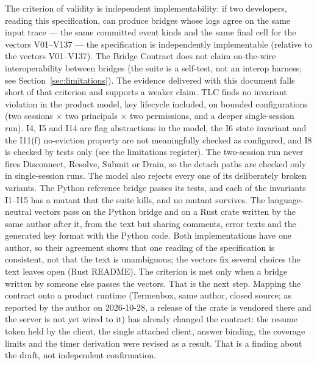 The criterion of validity is independent implementability: if two
developers, reading this specification, can produce bridges whose logs
agree on the same input trace --- the same committed event kinds and the
same final cell for the vectors V01--V137 --- the specification is
independently implementable (relative to the vectors V01--V137). The Bridge Contract does not claim on-the-wire
interoperability between bridges (the suite is a self-test, not an
interop harness; see Section~\ref{sec:limitations}). The evidence
delivered with this document falls short of that criterion and supports
a weaker claim. TLC finds no invariant violation in the product model,
key lifecycle included, on bounded configurations (two sessions $\times$ two principals
$\times$ two permissions, and a deeper single-session run). I4, I5 and I14
are flag abstractions in the model, the I6 state invariant and the I11(f)
no-eviction property are not meaningfully checked as configured, and I8 is
checked by tests only (see the limitations register). The
two-session run never fires Disconnect, Resolve, Submit or Drain, so
the detach paths are checked only in single-session runs. The model
also rejects every one of its deliberately broken variants. The Python
reference bridge passes its tests, and each of the invariants I1--I15
has a mutant that the suite kills, and no mutant survives. The
language-neutral vectors pass on the Python bridge and on a Rust crate
written by the same author after it, from the text but sharing comments,
error texts and the generated key format with the Python code. Both implementations have one
author, so their agreement shows that one reading of the specification
is consistent, not that the text is unambiguous; the vectors fix
several choices the text leaves open (Rust README). The criterion is
met only when a bridge written by someone else passes the vectors. That
is the next step. Mapping the contract onto a product runtime
(Termenbox, same author, closed source; as reported by the author on 2026-10-28, a release of the crate is vendored there and the server is not yet wired to it) has already changed the contract: the
resume token held by the client, the single attached client, answer
binding, the coverage limits and the timer derivation were revised as a
result. That is a finding about the draft, not independent
confirmation.

